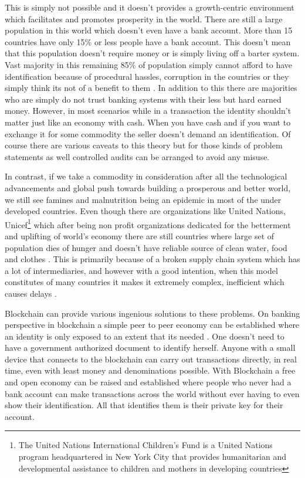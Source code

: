 This is simply not possible and it doesn't provides a growth-centric environment which facilitates and promotes prosperity in the world. There are still a large population in this world which doesn't even have a bank account. More than 15 countries have only 15\% or less people have a bank account. This doesn't mean that this population doesn't require money or is simply living off a barter system. Vast majority in this remaining 85\% of population simply cannot afford to have identification because of procedural hassles, corruption in the countries or they simply think its not of a benefit to them \cite{camilla15}. In addition to this there are majorities who are simply do not trust banking systems with their less but hard earned money. However, in most scenarios while in a transaction the identity shouldn't matter just like an economy with cash. When you have cash and if you want to exchange it for some commodity the seller doesn't demand an identification. Of course there are various caveats to this theory but for those kinds of problem statements as well controlled audits can be arranged to avoid any misuse.

In contrast, if we take a commodity in consideration after all the technological advancements and global push towards building a prosperous and better world, we still see famines and malnutrition being an epidemic in most of the under developed countries. Even though there are organizations like United Nations, Unicef\footnote{The United Nations International Children's Fund is a United Nations program headquartered in New York City that provides humanitarian and developmental assistance to children and mothers in developing countries} which after being non profit organizations dedicated for the betterment and uplifting of world's economy there are still countries where large set of population dies of hunger and doesn't have reliable source of clean water, food and clothes \cite{bbc16}. This is primarily because of a broken supply chain system which has a lot of intermediaries, and however with a good intention, when this model constitutes of many countries it makes it extremely complex, inefficient which causes delays \cite{van16}.


Blockchain can provide various ingenious solutions to these problems. On banking perspective in blockchain a simple peer to peer economy can be established where an identity is only exposed to an extent that its needed \cite{yli18}. One doesn't need to have a government authorized document to identify herself. Anyone with a small device that connects to the blockchain can carry out transactions directly, in real time, even with least money and denominations possible. With Blockchain a free and open economy can be raised and established where people who never had a bank account can make transactions across the world without ever having to even show their identification. All that identifies them is their private key for their account.

